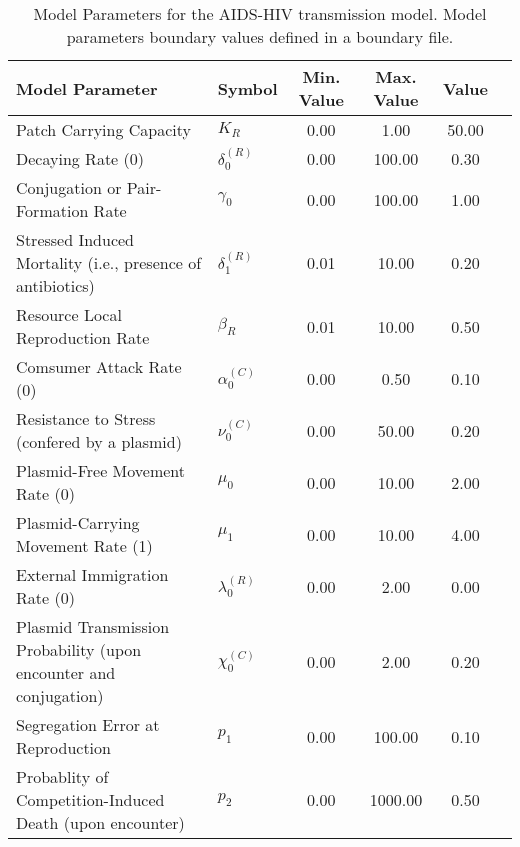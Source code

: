 \begin{table}
\centering
\begin{tabular}{p{5cm}lcccc}
{\bf Model Parameter} & {\bf Symbol} & {\bf Min. Value} & {\bf Max. Value} & {\bf Value}\\
\hline\hline
Patch Carrying Capacity & $K_R$ & 0.00 & 1.00 & 50.00\\
Decaying Rate (0) & $\delta^{(R)}_0$ & 0.00 & 100.00 & 0.30\\
Conjugation or Pair-Formation Rate & $\gamma_0$ & 0.00 & 100.00 & 1.00\\
Stressed Induced Mortality (i.e., presence of antibiotics) & $\delta^{(R)}_1$ & 0.01 & 10.00 & 0.20\\
Resource Local Reproduction Rate & $\beta_R$ & 0.01 & 10.00 & 0.50\\
Comsumer Attack Rate (0) & $\alpha^{(C)}_0$ & 0.00 & 0.50 & 0.10\\
Resistance to Stress (confered by a plasmid) & $\nu^{(C)}_0$ & 0.00 & 50.00 & 0.20\\
Plasmid-Free Movement Rate (0) & $\mu_0$ & 0.00 & 10.00 & 2.00\\
Plasmid-Carrying Movement Rate (1) & $\mu_1$ & 0.00 & 10.00 & 4.00\\
External Immigration Rate (0) & $\lambda^{(R)}_0$ & 0.00 & 2.00 & 0.00\\
Plasmid Transmission Probability (upon encounter and conjugation) & $\chi^{(C)}_0$ & 0.00 & 2.00 & 0.20\\
Segregation Error at Reproduction & $p_1$ & 0.00 & 100.00 & 0.10\\
Probablity of Competition-Induced Death (upon encounter) & $p_2$ & 0.00 & 1000.00 & 0.50\\
\hline\hline
\end{tabular}
\caption{Model Parameters for the AIDS-HIV transmission model. Model parameters boundary values defined in a boundary file.}
\end{table}
